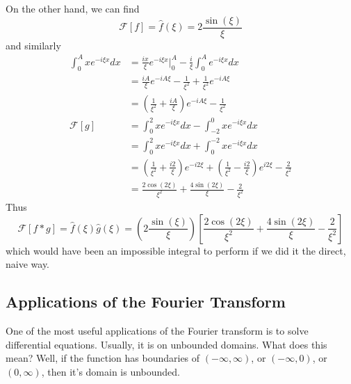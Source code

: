 \begin{ex}
On the other hand, we can find
\begin{equation}
\mathcal{F}[f] = \widehat{f}(\xi) = 2\frac{\sin(\xi)}{\xi}
\end{equation}
and similarly
\begin{subequations}
\begin{align}
\int^{A}_{0}xe^{-i\xi x}dx &= \frac{ix}{\xi}e^{-i\xi
  x}\Big|^{A}_{0} - \frac{i}{\xi}\int^{A}_{0}e^{-i\xi x}dx\\
&= \frac{iA}{\xi}e^{-iA\xi} - \frac{1}{\xi^2} + \frac{1}{\xi^2}e^{-iA\xi}\\
&= \left(\frac{1}{\xi^2} + \frac{iA}{\xi}\right)e^{-iA\xi} - \frac{1}{\xi^2}\\ 
\mathcal{F}[g] &= \int^{2}_{0}xe^{-i\xi x}dx -\int^{0}_{-2}xe^{-i \xi x}dx\\ 
&= \int^{2}_{0}xe^{-i\xi x}dx +\int^{-2}_{0}xe^{-i \xi x}dx\\ 
&= \left(\frac{1}{\xi^2}+\frac{i2}{\xi}\right)e^{-i2\xi} +
\left(\frac{1}{\xi^2} - \frac{i2}{\xi}\right)e^{i2\xi} -
\frac{2}{\xi^2}\\
&= \frac{2\cos(2\xi)}{\xi^2} + \frac{4\sin(2\xi)}{\xi} - \frac{2}{\xi^2}
\end{align}
\end{subequations}
Thus
\begin{equation}
\mathcal{F}[f*g] = \widehat{f}(\xi)\widehat{g}(\xi) =
  \left(2\frac{\sin(\xi)}{\xi}\right)\left[\frac{2\cos(2\xi)}{\xi^2} + \frac{4\sin(2\xi)}{\xi} - \frac{2}{\xi^2}\right]
\end{equation}
which would have been an impossible integral to perform if
we did it the direct, naive way.
\end{ex}
\subsection{Applications of the Fourier Transform}

One of the most useful applications of the Fourier transform
is to solve differential equations. Usually, it is on
unbounded domains. What does this mean? Well, if the
function has boundaries of $(-\infty,\infty)$, or
$(-\infty,0)$, or $(0,\infty)$, then it's domain is
unbounded.

